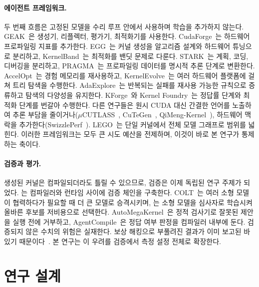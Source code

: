 \documentclass[11pt]{article}
\begin{document}
\paragraph{에이전트 프레임워크.}
두 번째 흐름은 고정된 모델을 수리 루프 안에서 사용하며 학습을 추가하지 않는다.
GEAK~\citep{wang2025geak}은 생성기, 리플렉터, 평가기, 최적화기를 사용한다.
CudaForge~\citep{cudaforge2025}는 하드웨어 프로파일링 지표를 추가한다. EGG~\citep{egg2026}는 커널
생성을 알고리즘 설계와 하드웨어 튜닝으로 분리하고, KernelBand~\citep{kernelband2026}는 최적화를
밴딧 문제로 다룬다. STARK~\citep{stark2026}는 계획, 코딩, 디버깅을 분리하고,
PRAGMA~\citep{lei2025pragma}는 프로파일링 데이터를 명시적 추론 단계로 변환한다.
AccelOpt~\citep{accelopt2025}는 경험 메모리를 재사용하고, KernelEvolve~\citep{liao2026kernelevolve}는
여러 하드웨어 플랫폼에 걸쳐 트리 탐색을 수행한다.
AdaExplore~\citep{du2026adaexplore}는 반복되는 실패를 재사용 가능한 규칙으로 증류하고 탐색의 다양성을
유지한다. KForge~\citep{sereda2026kforge}와 Kernel Foundry~\citep{huang2026kernelfoundry}는 정답률
단계와 최적화 단계를 번갈아 수행한다. 다른 연구들은 원시 CUDA 대신 간결한 언어를 노출하여 추론
부담을 줄이거나($\mu$CUTLASS~\citep{hari2026ucutlass}, CuTeGen~\citep{saba2026cutegen},
QiMeng-Kernel~\citep{qimengkernel2026}), 하드웨어 맥락을 추가한다(SwizzlePerf~\citep{swizzleperf2025}).
LEGO~\citep{lego2026}는 단일 커널에서 전체 모델 그래프로 범위를 넓힌다. 이러한 프레임워크는 모두
큰 시도 예산을 전제하며, 이것이 바로 본 연구가 통제하는 축이다.

\paragraph{검증과 평가.}
생성된 커널은 컴파일되더라도 틀릴 수 있으므로, 검증은 이제 독립된 연구 주제가 되었다.
\citet{kwon2026cove}는 컴파일러와 런타임 사이에 검증 체인을 구축한다.
COLT~\citep{tang2026colt}는 여러 소형 모델이 협력하다가 필요할 때 더 큰 모델로 승격시키며,
\citet{crupi2026slmjudge}는 소형 모델을 심사자로 학습시켜 올바른 후보를 저비용으로 선택한다.
AutoMegaKernel~\citep{jaber2026automegakernel}은 정적 검사기로 잘못된 제안을 실행 전에 거부하고,
AgentCompile~\citep{li2026agentcompile}은 정답 여부 판정을 컴파일러 내부에 둔다. 검증되지 않은
수치의 위험은 실재한다. 보상 해킹으로 부풀려진 결과가 이미 보고된 바 있기
때문이다~\citep{lange2025aicudaengineer}. 본 연구는 이 우려를 검증에서 측정 설정 전체로 확장한다.

\section{연구 설계}\label{sec:design}
\end{document}
